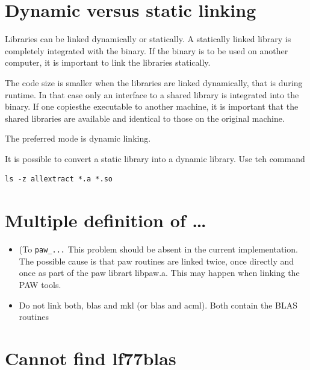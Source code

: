 \documentclass[a4paper,10pt]{report}
\newcommand{\mytt}[1]{{\tt #1}}
\begin{document}
\section{Dynamic versus static linking}
Libraries can be linked dynamically or statically. A statically linked
library is completely integrated with the binary. If the binary is to
be used on another computer, it is important to link the libraries statically.

The code size is smaller when the libraries are linked dynamically,
that is during runtime. In that case only an interface to a shared
library is integrated into the binary. If one copiesthe executable to
another machine, it is important that the shared libraries are
available and identical to those on the original machine.

The preferred mode is dynamic linking.

It is possible to convert a static library into a dynamic library. Use teh command
\begin{verbatim}
ls -z allextract *.a *.so
\end{verbatim}



\section{Multiple definition of \ldots}
\begin{itemize}
\item (To \mytt{paw\_...} This problem should be absent in the current implementation.
The possible cause is that paw routines are linked twice, once
directly and once as part of the paw librart libpaw.a. This may happen
when linking the PAW tools.
\item Do not link both, blas and mkl (or blas and acml). Both contain the BLAS routines
\end{itemize}


\section{Cannot find lf77blas}
\end{document}
